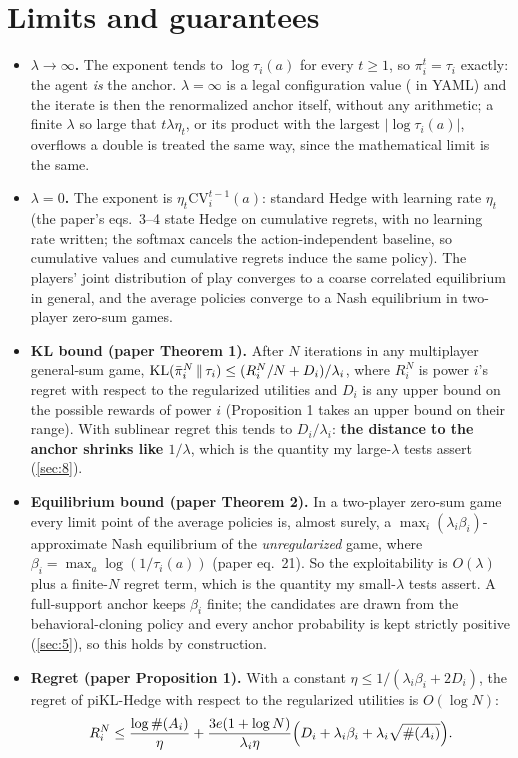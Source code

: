\documentclass[12pt,a4paper]{article}
\begin{document}
\section{Limits and guarantees}\label{sec:4}

\begin{itemize}
\item \textbf{$\lambda \to \infty$.}
The exponent tends to $\log \tau_i(a)$ for every $t \ge 1$, so $\pi_i^{t} = \tau_i$ exactly: the agent \emph{is} the anchor.
$\lambda = \infty$ is a legal configuration value ( in YAML) and the iterate is then the renormalized anchor itself, without any arithmetic; a finite $\lambda$ so large that $t \lambda \eta_t$, or its product with the largest $\lvert \log \tau_i(a) \rvert$, overflows a double is treated the same way, since the mathematical limit is the same.
\item \textbf{$\lambda = 0$.}
The exponent is $\eta_t \mathrm{CV}_i^{t-1}(a)$: standard Hedge with learning rate $\eta_t$ (the paper's eqs.~3--4 state Hedge on cumulative regrets, with no learning rate written; the softmax cancels the action-independent baseline, so cumulative values and cumulative regrets induce the same policy).
The players' joint distribution of play converges to a coarse correlated equilibrium in general, and the average policies converge to a Nash equilibrium in two-player zero-sum games.
\item \textbf{KL bound (paper Theorem 1).}
After $N$ iterations in any multiplayer general-sum game, $\operatorname{KL}(\bar{\pi}_i^{N} \,\|\, \tau_i) \le (R_i^{N} / N + D_i) / \lambda_i$, where $R_i^{N}$ is power $i$'s regret with respect to the regularized utilities and $D_i$ is any upper bound on the possible rewards of power $i$ (Proposition 1 takes an upper bound on their range).
With sublinear regret this tends to $D_i / \lambda_i$: \textbf{the distance to the anchor shrinks like $1 / \lambda$}, which is the quantity my large-$\lambda$ tests assert (\cref{sec:8}).
\item \textbf{Equilibrium bound (paper Theorem 2).}
In a two-player zero-sum game every limit point of the average policies is, almost surely, a $\max_i(\lambda_i \beta_i)$-approximate Nash equilibrium of the \emph{unregularized} game, where $\beta_i = \max_a \log(1 / \tau_i(a))$ (paper eq.~21).
So the exploitability is $O(\lambda)$ plus a finite-$N$ regret term, which is the quantity my small-$\lambda$ tests assert.
A full-support anchor keeps $\beta_i$ finite; the candidates are drawn from the behavioral-cloning policy and every anchor probability is kept strictly positive (\cref{sec:5}), so this holds by construction.
\item \textbf{Regret (paper Proposition 1).}
With a constant $\eta \le 1 / (\lambda_i \beta_i + 2 D_i)$, the regret of piKL-Hedge with respect to the regularized utilities is $O(\log N)$:
\[
R_i^{N} \le \frac{\log \#(A_i)}{\eta} + \frac{3e(1 + \log N)}{\lambda_i \eta} \Bigl( D_i + \lambda_i \beta_i + \lambda_i \sqrt{\#(A_i)} \Bigr).
\]
\end{itemize}
\end{document}
